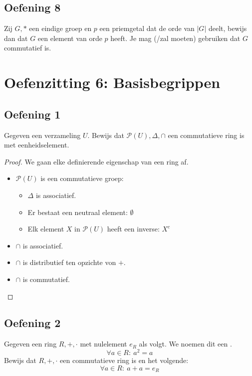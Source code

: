 \documentclass[main.tex]{subfiles}
\begin{document}
\subsection*{Oefening 8}
Zij $G,*$ een eindige groep en $p$ een priemgetal dat de orde van $|G|$ deelt, bewijs dan dat $G$ een element van orde $p$ heeft. Je mag (/zal moeten) gebruiken dat $G$ commutatief is.


\section{Oefenzitting 6: Basisbegrippen}

\subsection*{Oefening 1}
Gegeven een verzameling $U$.
Bewijs dat $\mathcal{P}(U),\Delta,\cap$ een commutatieve ring is met eenheidselement.

\begin{proof}
  We gaan elke definierende eigenschap van een ring af.
  \begin{itemize}
  \item $\mathcal{P}(U)$ is een commutatieve groep:
    \begin{itemize}
    \item $\Delta$ is associatief.
    \item Er bestaat een neutraal element: $\emptyset$
    \item Elk element $X$ in $\mathcal{P}(U)$ heeft een inverse: $X^{c}$
    \end{itemize}
  \item $\cap$ is associatief. 
  \item $\cap$ is distributief ten opzichte von $+$.
  \item $\cap$ is commutatief.
  \end{itemize}
\end{proof}

\subsection*{Oefening 2}
Gegeven een ring $R,+,\cdot$ met nulelement $e_{R}$ als volgt.
We noemen dit een .
\[ \forall a\in R:\ a^{2} = a \]
Bewijs dat $R,+,\cdot$ een commutatieve ring is en het volgende:
\[ \forall a \in R:\ a+a = e_{R}\]
\end{document}
